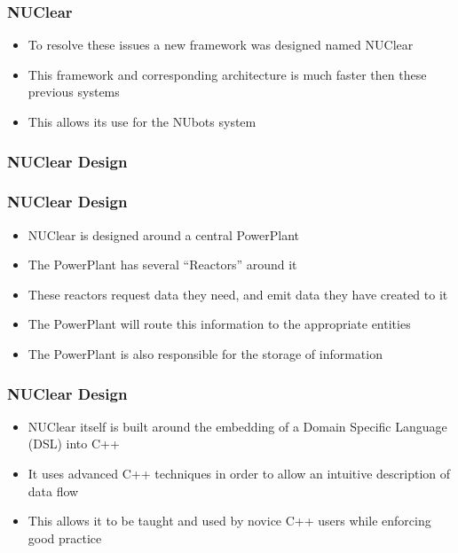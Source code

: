 \documentclass{beamer}
\begin{document}
\begin{frame}
	\frametitle{NUClear}
	\begin{itemize}
		\item To resolve these issues a new framework was designed named NUClear
		\item This framework and corresponding architecture is much faster then these previous systems
		\item This allows its use for the NUbots system
	\end{itemize}
\end{frame}

\begin{frame}
	\frametitle{NUClear Design}
	\centering
\end{frame}

\begin{frame}
	\frametitle{NUClear Design}
	\begin{itemize}
		\item NUClear is designed around a central PowerPlant
		\item The PowerPlant has several ``Reactors'' around it
		\item These reactors request data they need, and emit data they have created to it
		\item The PowerPlant will route this information to the appropriate entities
		\item The PowerPlant is also responsible for the storage of information
	\end{itemize}
\end{frame}

\begin{frame}
	\frametitle{NUClear Design}
	\begin{itemize}
		\item NUClear itself is built around the embedding of a Domain Specific Language (DSL) into C++
		\item It uses advanced C++ techniques in order to allow an intuitive description of data flow
		\item This allows it to be taught and used by novice C++ users while enforcing good practice
	\end{itemize}
\end{frame}
\end{document}
